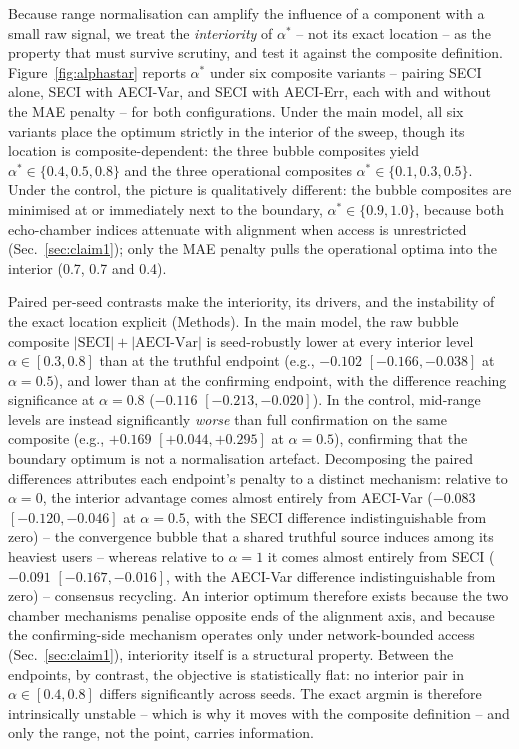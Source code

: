 \documentclass[pdflatex,sn-nature]{sn-jnl}
\begin{document}
Because range normalisation can amplify the influence of a component with a small raw signal, we treat the \emph{interiority} of $\alpha^{*}$ -- not its exact location -- as the property that must survive scrutiny, and test it against the composite definition. Figure~\ref{fig:alphastar} reports $\alpha^{*}$ under six composite variants -- pairing SECI alone, SECI with AECI-Var, and SECI with AECI-Err, each with and without the MAE penalty -- for both configurations. Under the main model, all six variants place the optimum strictly in the interior of the sweep, though its location is composite-dependent: the three bubble composites yield $\alpha^{*} \in \{0.4, 0.5, 0.8\}$ and the three operational composites $\alpha^{*} \in \{0.1, 0.3, 0.5\}$. Under the control, the picture is qualitatively different: the bubble composites are minimised at or immediately next to the boundary, $\alpha^{*} \in \{0.9, 1.0\}$, because both echo-chamber indices attenuate with alignment when access is unrestricted (Sec.~\ref{sec:claim1}); only the MAE penalty pulls the operational optima into the interior (0.7, 0.7 and 0.4).

Paired per-seed contrasts make the interiority, its drivers, and the instability of the exact location explicit (Methods). In the main model, the raw bubble composite $|\text{SECI}| + |\text{AECI-Var}|$ is seed-robustly lower at every interior level $\alpha \in [0.3, 0.8]$ than at the truthful endpoint (e.g., $-0.102$ $[-0.166, -0.038]$ at $\alpha = 0.5$), and lower than at the confirming endpoint, with the difference reaching significance at $\alpha = 0.8$ ($-0.116$ $[-0.213, -0.020]$). In the control, mid-range levels are instead significantly \emph{worse} than full confirmation on the same composite (e.g., $+0.169$ $[+0.044, +0.295]$ at $\alpha = 0.5$), confirming that the boundary optimum is not a normalisation artefact. Decomposing the paired differences attributes each endpoint's penalty to a distinct mechanism: relative to $\alpha = 0$, the interior advantage comes almost entirely from AECI-Var ($-0.083$ $[-0.120, -0.046]$ at $\alpha = 0.5$, with the SECI difference indistinguishable from zero) -- the convergence bubble that a shared truthful source induces among its heaviest users -- whereas relative to $\alpha = 1$ it comes almost entirely from SECI ($-0.091$ $[-0.167, -0.016]$, with the AECI-Var difference indistinguishable from zero) -- consensus recycling. An interior optimum therefore exists because the two chamber mechanisms penalise opposite ends of the alignment axis, and because the confirming-side mechanism operates only under network-bounded access (Sec.~\ref{sec:claim1}), interiority itself is a structural property. Between the endpoints, by contrast, the objective is statistically flat: no interior pair in $\alpha \in [0.4, 0.8]$ differs significantly across seeds. The exact argmin is therefore intrinsically unstable -- which is why it moves with the composite definition -- and only the range, not the point, carries information.
\end{document}
